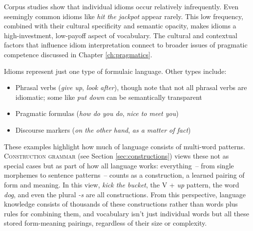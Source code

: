Corpus studies show that individual idioms occur relatively infrequently. Even seemingly common idioms like \textit{hit the jackpot} appear rarely. This low frequency, combined with their cultural specificity and semantic opacity, makes idioms a high-investment, low-payoff aspect of vocabulary. The cultural and contextual factors that influence idiom interpretation connect to broader issues of pragmatic competence discussed in Chapter \ref{ch:pragmatics}.

Idioms represent just one type of formulaic language. Other types include:
\begin{itemize}[noitemsep]
\item Phrasal verbs (\textit{give up}, \textit{look after}), though note that not all phrasal verbs are idiomatic; some like \textit{put down} can be semantically transparent
\item Pragmatic formulas (\textit{how do you do}, \textit{nice to meet you})
\item Discourse markers (\textit{on the other hand}, \textit{as a matter of fact})
\end{itemize}

These examples highlight how much of language consists of multi-word patterns. \textsc{Construction grammar} (see Section \ref{sec:constructions}) views these not as special cases but as part of how all language works: everything~-- from single morphemes to sentence patterns~-- counts as a construction, a learned pairing of form and meaning. In this view, \textit{kick the bucket}, the V + \textit{up} pattern, the word \textit{dog}, and even the plural \textit{-s} are all constructions. From this perspective, language knowledge consists of thousands of these constructions rather than words plus rules for combining them, and vocabulary isn't just individual words but all these stored form-meaning pairings, regardless of their size or complexity.

